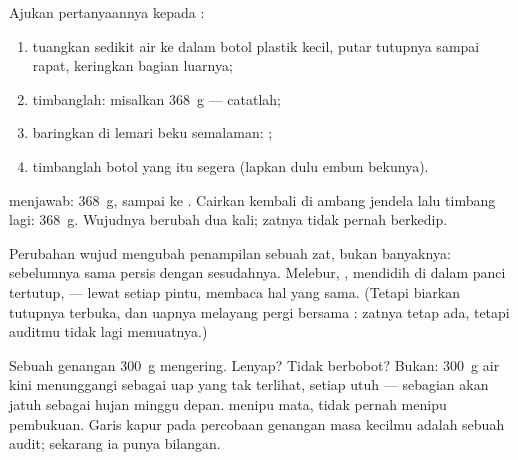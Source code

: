 \begin{method}\label{met:g6:water-states:weigh}
Ajukan pertanyaannya kepada :
\begin{enumerate}
  \item tuangkan sedikit air ke dalam botol plastik kecil, putar
        tutupnya sampai rapat, keringkan bagian luarnya;
  \item timbanglah: misalkan \qty{368}{g} --- catatlah;
  \item baringkan di lemari beku semalaman: ;
  \item timbanglah botol yang  itu segera (lapkan dulu embun
        bekunya).
\end{enumerate}
 menjawab: \qty{368}{g}, sampai ke . Cairkan kembali
di ambang jendela lalu timbang lagi: \qty{368}{g}. Wujudnya berubah
dua kali; zatnya tidak pernah berkedip.
\end{method}

\begin{proposition}\label{prop:g6:water-states:mass}
Perubahan wujud mengubah penampilan sebuah zat, bukan banyaknya: 
sebelumnya sama persis dengan  sesudahnya. Melebur, ,
mendidih di dalam panci tertutup,  --- lewat setiap pintu,
 membaca hal yang sama. (Tetapi biarkan tutupnya terbuka, dan
uapnya melayang pergi bersama : zatnya tetap ada, tetapi
auditmu tidak lagi memuatnya.)
\end{proposition}

\begin{example}\label{ex:g6:water-states:puddle}
Sebuah genangan \qty{300}{g} mengering. Lenyap? Tidak berbobot? Bukan:
\qty{300}{g} air kini menunggangi  sebagai uap yang tak terlihat,
setiap  utuh --- sebagian akan jatuh sebagai hujan minggu
depan.  menipu mata, tidak pernah menipu pembukuan. Garis
kapur pada percobaan genangan masa kecilmu adalah sebuah audit;
sekarang ia punya bilangan.
\end{example}

